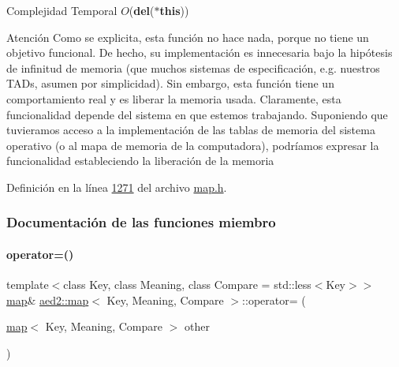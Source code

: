 \begin{DoxyDescription}
\item[Complejidad Temporal]$O$({\bfseries del}({\bfseries $\ast$this}))
\end{DoxyDescription}

\begin{DoxyAttention}{Atención}
Como se explicita, esta función no hace nada, porque no tiene un objetivo funcional. De hecho, su implementación es innecesaria bajo la hipótesis de infinitud de memoria (que muchos sistemas de especificación, e.\+g. nuestros T\+A\+Ds, asumen por simplicidad). Sin embargo, esta función tiene un comportamiento real y es liberar la memoria usada. Claramente, esta funcionalidad depende del sistema en que estemos trabajando. Suponiendo que tuvieramos acceso a la implementación de las tablas de memoria del sistema operativo (o al mapa de memoria de la computadora), podríamos expresar la funcionalidad estableciendo la liberación de la memoria 
\end{DoxyAttention}


Definición en la línea \hyperlink{map_8h_source_l01271}{1271} del archivo \hyperlink{map_8h_source}{map.\+h}.



\subsubsection{Documentación de las funciones miembro}
\mbox{\label{classaed2_1_1map_ac606d334809066929522964d45e76317_ac606d334809066929522964d45e76317}} 
\paragraph{\texorpdfstring{operator=()}{operator=()}}
{\footnotesize\ttfamily template$<$class Key, class Meaning, class Compare = std\+::less$<$\+Key$>$$>$ \\
\hyperlink{classaed2_1_1map}{map}\& \hyperlink{classaed2_1_1map}{aed2\+::map}$<$ Key, Meaning, Compare $>$\+::operator= (\begin{DoxyParamCaption}\item[{\hyperlink{classaed2_1_1map}{map}$<$ Key, Meaning, Compare $>$}]{other }\end{DoxyParamCaption})\hspace{0.3cm}{\ttfamily [inline]}}



